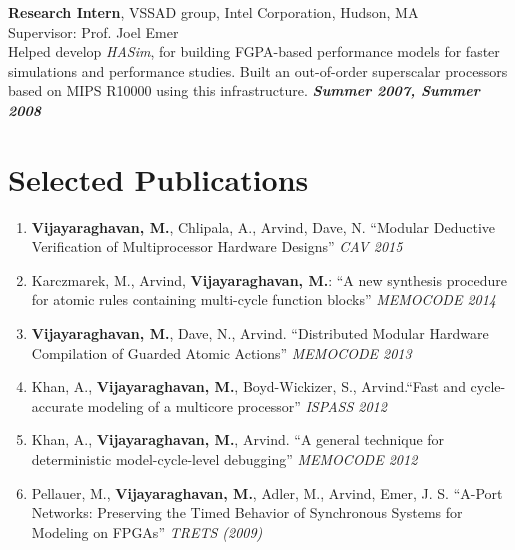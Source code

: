 \documentclass[margin,line]{resume}
\begin{document}
\begin{resume}
    \vspace{-7mm}
    \textbf{Research Intern}, VSSAD group, Intel Corporation, Hudson, MA\\
    Supervisor: Prof. Joel Emer \\
    Helped develop \emph{HASim}, for building FGPA-based performance
          models for faster simulations and performance studies. Built an out-of-order superscalar
          processors based on MIPS R10000 using this infrastructure. \hfill \textbf{\textit{Summer 2007, Summer 2008}}\\
    \vspace{-9mm}
    \section{\mysidestyle Selected Publications}
    \begin{enumerate}
    \item \textbf{Vijayaraghavan, M.}, Chlipala, A., Arvind, Dave, N.
    ``Modular Deductive Verification of Multiprocessor Hardware Designs'' \textit{CAV 2015}
    \item Karczmarek, M., Arvind, \textbf{Vijayaraghavan, M.}:
    ``A new synthesis procedure for atomic rules containing multi-cycle function blocks'' \textit{MEMOCODE 2014}
    \item \textbf{Vijayaraghavan, M.}, Dave, N., Arvind.
    ``Distributed Modular Hardware Compilation of Guarded Atomic Actions'' \textit{MEMOCODE 2013}
    \item Khan, A., \textbf{Vijayaraghavan, M.}, Boyd-Wickizer, S., Arvind.``Fast and cycle-accurate modeling of 
    a multicore processor''
    \textit {ISPASS 2012}
    \item Khan, A., \textbf{Vijayaraghavan, M.}, Arvind. ``A general technique for deterministic model-cycle-level debugging''
    \textit{MEMOCODE 2012}
    \item Pellauer, M., \textbf{Vijayaraghavan, M.}, Adler, M., Arvind, Emer, J. S.
    ``A-Port Networks: Preserving the Timed Behavior of Synchronous Systems for
    Modeling on FPGAs'' \textit{TRETS (2009)}

\end{enumerate}
\end{resume}
\end{document}
